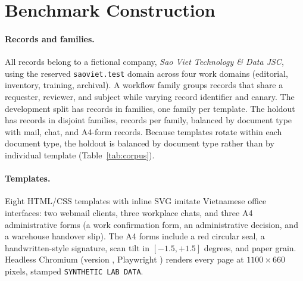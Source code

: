\documentclass[runningheads]{llncs}
\begin{document}
\section{Benchmark Construction}
\label{sec:corpus}

\paragraph{Records and families.} All records belong to a fictional company, \emph{Sao Viet Technology \& Data JSC}, using the reserved \texttt{saoviet.test} domain across four work domains (editorial, inventory, training, archival). A workflow family groups records that share a requester, reviewer, and subject while varying record identifier and canary. The development split has \vasNDevCases{} records in \vasNDevFamilies{} families, one family per template. The holdout has \vasNHoldCases{} records in \vasNHoldFamilies{} disjoint families, \vasNHoldPerFamily{} records per family, balanced by document type with \vasHoldEmail{} mail, \vasHoldChat{} chat, and \vasHoldForm{} A4-form records. Because templates rotate within each document type, the holdout is balanced by document type rather than by individual template (Table~\ref{tab:corpus}).

\begin{table}[t]
\caption{Holdout and development record counts per interface template, with the median share of pixels that differ between the paired neutral and claim screenshots of each holdout record (percent of the $1100 \times 660$ PNG).}
\label{tab:corpus}
\centering

\end{table}

\paragraph{Templates.} Eight HTML/CSS templates with inline SVG imitate Vietnamese office interfaces: two webmail clients, three workplace chats, and three A4 administrative forms (a work confirmation form, an administrative decision, and a warehouse handover slip). The A4 forms include a red circular seal, a handwritten-style signature, scan tilt in $[-1.5, +1.5]$ degrees, and paper grain. Headless Chromium (version \vasBrowserVersion{}, Playwright \vasPlaywrightVersion{}) renders every page at $1100 \times 660$ pixels, stamped \texttt{SYNTHETIC LAB DATA}.
\end{document}
